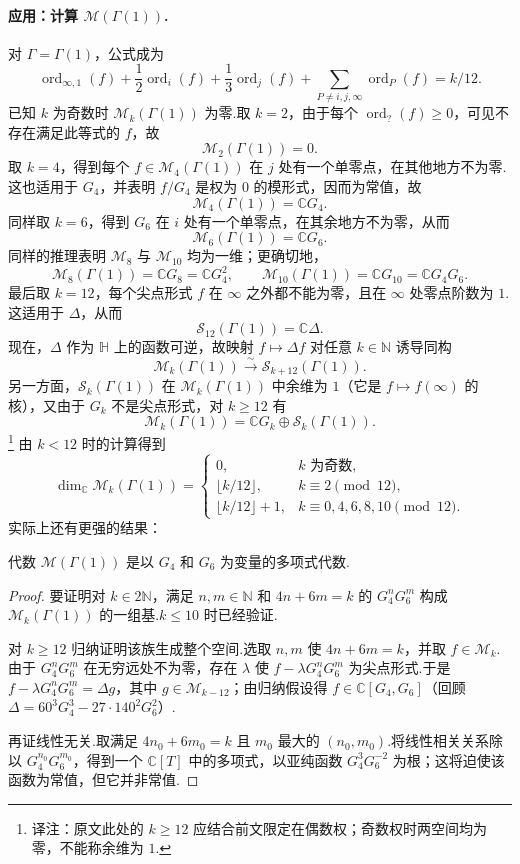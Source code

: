 \paragraph{应用：计算 $\mathcal M(\Gamma(1))$.}
对 $\Gamma=\Gamma(1)$，公式成为
\[
\operatorname{ord}_{\infty,1}(f)+\frac12\operatorname{ord}_i(f)+\frac13\operatorname{ord}_j(f)+\sum_{P\ne i,j,\infty}\operatorname{ord}_P(f)=k/12.
\]
已知 $k$ 为奇数时 $\mathcal M_k(\Gamma(1))$ 为零.取 $k=2$，由于每个 $\operatorname{ord}_{?}(f)\ge0$，可见不存在满足此等式的 $f$，故
\[
\mathcal M_2(\Gamma(1))=0.
\]
取 $k=4$，得到每个 $f\in\mathcal M_4(\Gamma(1))$ 在 $j$ 处有一个单零点，在其他地方不为零.这也适用于 $G_4$，并表明 $f/G_4$ 是权为 $0$ 的模形式，因而为常值，故
\[
\mathcal M_4(\Gamma(1))=\mathbb C G_4.
\]
同样取 $k=6$，得到 $G_6$ 在 $i$ 处有一个单零点，在其余地方不为零，从而
\[
\mathcal M_6(\Gamma(1))=\mathbb C G_6.
\]
同样的推理表明 $\mathcal M_8$ 与 $\mathcal M_{10}$ 均为一维；更确切地，
\[
\mathcal M_8(\Gamma(1))=\mathbb C G_8=\mathbb C G_4^2,\qquad
\mathcal M_{10}(\Gamma(1))=\mathbb C G_{10}=\mathbb C G_4G_6.
\]
最后取 $k=12$，每个尖点形式 $f$ 在 $\infty$ 之外都不能为零，且在 $\infty$ 处零点阶数为 $1$.这适用于 $\Delta$，从而
\[
\mathcal S_{12}(\Gamma(1))=\mathbb C\Delta.
\]
现在，$\Delta$ 作为 $\mathbb H$ 上的函数可逆，故映射 $f\mapsto\Delta f$ 对任意 $k\in\mathbb N$ 诱导同构
\[
\mathcal M_k(\Gamma(1))\xrightarrow{\sim}\mathcal S_{k+12}(\Gamma(1)).
\]
另一方面，$\mathcal S_k(\Gamma(1))$ 在 $\mathcal M_k(\Gamma(1))$ 中余维为 $1$（它是 $f\mapsto f(\infty)$ 的核），又由于 $G_k$ 不是尖点形式，对 $k\ge12$ 有
\[
\mathcal M_k(\Gamma(1))=\mathbb C G_k\oplus\mathcal S_k(\Gamma(1)).
\]
\footnote{译注：原文此处的 $k\ge12$ 应结合前文限定在偶数权；奇数权时两空间均为零，不能称余维为 $1$.}
由 $k<12$ 时的计算得到
\[
\dim_{\mathbb C}\mathcal M_k(\Gamma(1))=
\begin{cases}
0,&k\text{ 为奇数},\\
\lfloor k/12\rfloor,&k\equiv2\pmod{12},\\
\lfloor k/12\rfloor+1,&k\equiv0,4,6,8,10\pmod{12}.
\end{cases}
\]
实际上还有更强的结果：
\begin{proposition*}
代数 $\mathcal M(\Gamma(1))$ 是以 $G_4$ 和 $G_6$ 为变量的多项式代数.
\end{proposition*}
\begin{proof}
要证明对 $k\in2\mathbb N$，满足 $n,m\in\mathbb N$ 和 $4n+6m=k$ 的 $G_4^nG_6^m$ 构成 $\mathcal M_k(\Gamma(1))$ 的一组基.$k\le10$ 时已经验证.

对 $k\ge12$ 归纳证明该族生成整个空间.选取 $n,m$ 使 $4n+6m=k$，并取 $f\in\mathcal M_k$.由于 $G_4^nG_6^m$ 在无穷远处不为零，存在 $\lambda$ 使 $f-\lambda G_4^nG_6^m$ 为尖点形式.于是 $f-\lambda G_4^nG_6^m=\Delta g$，其中 $g\in\mathcal M_{k-12}$；由归纳假设得 $f\in\mathbb C[G_4,G_6]$（回顾 $\Delta=60^3G_4^3-27\cdot140^2G_6^2$）.

再证线性无关.取满足 $4n_0+6m_0=k$ 且 $m_0$ 最大的 $(n_0,m_0)$.将线性相关关系除以 $G_4^{n_0}G_6^{m_0}$，得到一个 $\mathbb C[T]$ 中的多项式，以亚纯函数 $G_4^3G_6^{-2}$ 为根；这将迫使该函数为常值，但它并非常值.
\end{proof}
